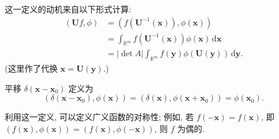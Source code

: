 这一定义的动机来自以下形式计算:\[
\begin{aligned}
(\bm{U}f,\phi)&=(f(\bm{U}^{-1}(\bm{x})),\phi(\bm{x}))\\
&=\int_{\mathbb{R}^m}f(\bm{U}^{-1}(\bm{x}))\phi(\bm{x})\,\mathrm{d}\bm{x}\\
&=|\det A|\int_{\mathbb{R}^m}f(\bm{y})\phi(\bm{U}(\bm{y}))\,\mathrm{d}\bm{y}.
\end{aligned}
\](这里作了代换 $\bm{x}=\bm{U}(\bm{y})$.)

\begin{Example}
\label{ex:translated-dirac-delta}
平移 $\delta(\bm{x}-\bm{x}_0)$ 定义为
\begin{equation}\label{eq:translated-dirac-delta-pairing}
(\delta(\bm{x}-\bm{x}_0),\phi(\bm{x}))=(\delta(\bm{x}),\phi(\bm{x}+\bm{x}_0))=\phi(\bm{x}_0).
\end{equation}

\end{Example}

\begin{Remark}
\label{rem:distribution-symmetry}
利用这一定义, 可以定义广义函数的对称性; 例如, 若 $f(-\bm{x})=f(\bm{x})$, 即 $(f(\bm{x}),\phi(\bm{x}))=(f(\bm{x}),\phi(-\bm{x}))$, 则 $f$ 为偶的.
\end{Remark}
